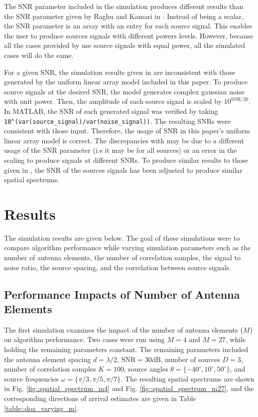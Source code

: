 \documentclass[conference]{IEEEtran}
\begin{document}
		The SNR parameter included in the simulation produces different results than the SNR parameter given by Raghu and Kamari in \cite{doa_algorithms_raghu}. Instead of being a scalar, the SNR parameter is an array with an entry for each source signal. This enables the user to produce sources signals with different powers levels. However, because all the cases provided by \cite{doa_algorithms_raghu} use source signals with equal power, all the simulated cases will do the same.
		
		For a given SNR, the simulation results given in \cite{doa_algorithms_raghu} are inconsistent with those generated by the uniform linear array model included in this paper. To produce source signals at the desired SNR, the model generates complex gaussian noise with unit power. Then, the amplitude of each source signal is scaled by $10^{\text{SNR}/20}$. In MATLAB, the SNR of each generated signal was verified by taking \texttt{10\^{}(var(source\_signal)/var(noise\_signal))}. The resulting SNRs were consistent with those input. Therefore, the usage of SNR in this paper's uniform linear array model is correct. The discrepancies with \cite{doa_algorithms_raghu} may be due to a different usage of the SNR parameter (i.e it may be for all sources) or an error in the scaling to produce signals at different SNRs. To produce similar results to those given in \cite{doa_algorithms_raghu}, the SNR of the sources signals has been adjusted to produce similar spatial spectrums.
		
		
	\section{Results}
	
		The simulation results are given below. The goal of these simulations were to compare algorithm performance while varying simulation parameters such as the number of antenna elements, the number of correlation samples, the signal to noise ratio, the source spacing, and the correlation between source signals.
		
		\subsection{Performance Impacts of Number of Antenna Elements}
		
		The first simulation examines the impact of the number of antenna elements ($M$) on algorithm performance. Two cases were run using $M = 4$ and $M=27$, while holding the remaining parameters constant. The remaining parameters included the antenna element spacing $d = \lambda/2$, $\text{SNR}=30\text{dB}$, number of sources $D=3$, number of correlation samples $K=100$, source angles $\theta = \{-40^{\circ}, 10^{\circ}, 50^{\circ}\}$, and source frequencies $\omega = \{\pi/3, \pi/5, \pi/7\}$. The resulting spatial spectrums are shown in Fig. \ref{fig::spatial_spectrum_m4} and Fig. \ref{fig::spatial_spectrum_m27}, and the corresponding directions of arrival estimates are given in Table \ref{table::doa_varying_m}.
		
\end{document}
